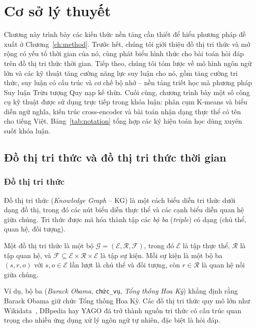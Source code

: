 \chapter{Cơ sở lý thuyết}
\label{ch:background}

Chương này trình bày các kiến thức nền tảng cần thiết để hiểu phương pháp đề xuất ở
Chương~\ref{ch:method}. Trước hết, chúng tôi giới thiệu đồ thị tri thức và mở rộng có yếu tố thời
gian của nó, cùng phát biểu hình thức cho bài toán hỏi đáp trên đồ thị tri thức thời gian. Tiếp
theo, chúng tôi tóm lược về mô hình ngôn ngữ lớn và các kỹ thuật tăng cường năng lực suy luận cho
nó, gồm tăng cường tri thức, suy luận có cấu trúc và cơ chế bộ nhớ -- nền tảng triết học mà phương
pháp Suy luận Trừu tượng Quy nạp kế thừa. Cuối cùng, chương trình bày một số công cụ kỹ thuật được
sử dụng trực tiếp trong khóa luận: phân cụm K-means và biểu diễn ngữ nghĩa, kiến trúc cross-encoder
và bài toán nhận dạng thực thể có tên cho tiếng Việt. Bảng~\ref{tab:notation} tổng hợp các ký hiệu
toán học dùng xuyên suốt khóa luận.

\section{Đồ thị tri thức và đồ thị tri thức thời gian}
\label{sec:tkg}

\subsection{Đồ thị tri thức}

Đồ thị tri thức (\textit{Knowledge Graph} -- KG) là một cách biểu diễn tri thức dưới dạng đồ thị,
trong đó các nút biểu diễn thực thể và các cạnh biểu diễn quan hệ giữa chúng. Tri thức được mã hóa
thành tập các \textit{bộ ba} (\textit{triple}) có dạng (chủ thể, quan hệ, đối tượng).

\begin{definition}
Một đồ thị tri thức là một bộ $\mathcal{G} = (\mathcal{E}, \mathcal{R}, \mathcal{F})$, trong đó
$\mathcal{E}$ là tập thực thể, $\mathcal{R}$ là tập quan hệ, và
$\mathcal{F} \subseteq \mathcal{E} \times \mathcal{R} \times \mathcal{E}$ là tập sự kiện. Mỗi sự
kiện là một bộ ba $(s, r, o)$ với $s, o \in \mathcal{E}$ lần lượt là chủ thể và đối tượng, còn
$r \in \mathcal{R}$ là quan hệ nối giữa chúng.
\end{definition}

Ví dụ, bộ ba (\textit{Barack Obama}, \texttt{chức\_vụ}, \textit{Tổng thống Hoa Kỳ}) khẳng định
rằng Barack Obama giữ chức Tổng thống Hoa Kỳ. Các đồ thị tri thức quy mô lớn như
Wikidata~\cite{vrandecic2014wikidata}, DBpedia hay YAGO đã trở thành nguồn tri thức có cấu trúc
quan trọng cho nhiều ứng dụng xử lý ngôn ngữ tự nhiên, đặc biệt là hỏi đáp.


